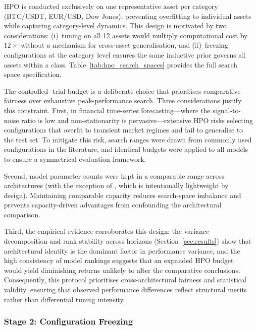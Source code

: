 HPO is conducted exclusively on one representative asset per category (BTC/USDT, EUR/USD, Dow Jones), preventing overfitting to individual assets while capturing category-level dynamics.  This design is motivated by two considerations: (i)~tuning on all 12 assets would multiply computational cost by $12\times$ without a mechanism for cross-asset generalisation, and (ii)~freezing configurations at the category level ensures the same inductive prior governs all assets within a class.  Table~\ref{tab:hpo_search_spaces} provides the full search space specification.

The controlled \ntrials-trial budget is a deliberate choice that prioritises comparative fairness over exhaustive peak-performance search.  Three considerations justify this constraint.  First, in financial time-series forecasting---where the signal-to-noise ratio is low and non-stationarity is pervasive---extensive HPO risks selecting configurations that overfit to transient market regimes and fail to generalise to the test set.  To mitigate this risk, search ranges were drawn from commonly used configurations in the literature, and identical budgets were applied to all models to ensure a symmetrical evaluation framework.

Second, model parameter counts were kept in a comparable range across architectures (with the exception of \dlinear, which is intentionally lightweight by design).  Maintaining comparable capacity reduces search-space imbalance and prevents capacity-driven advantages from confounding the architectural comparison.

Third, the empirical evidence corroborates this design: the variance decomposition and rank stability across horizons (Section~\ref{sec:results}) show that architectural identity is the dominant factor in performance variance, and the high consistency of model rankings suggests that an expanded HPO budget would yield diminishing returns unlikely to alter the comparative conclusions.  Consequently, this protocol prioritises cross-architectural fairness and statistical validity, ensuring that observed performance differences reflect structural merits rather than differential tuning intensity.



\subsubsection{Stage 2: Configuration Freezing}
\label{sec:stage2_freeze}

